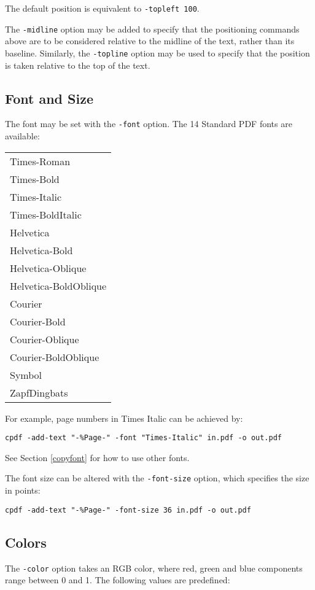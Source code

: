 \documentclass{book}
\begin{document}
The default position is equivalent to \texttt{-topleft 100}.

The \texttt{-midline} option may be added to specify that the positioning
commands above are to be considered relative to the midline of the text, rather
than its baseline. Similarly, the \texttt{-topline} option may be used to specify that the position is taken relative to the top of the text.

  \subsection{Font and Size}
  The font may be set with the \texttt{-font} option. The 14 Standard PDF fonts are available:

  \vspace{2mm}
  \begin{tabular}{l}
  Times-Roman\\
  Times-Bold\\
  Times-Italic\\
  Times-BoldItalic\\
  Helvetica\\
  Helvetica-Bold\\
  Helvetica-Oblique\\
  Helvetica-BoldOblique\\
  Courier\\
  Courier-Bold\\
  Courier-Oblique\\
  Courier-BoldOblique\\
  Symbol\\
  ZapfDingbats
  \end{tabular}

  \noindent For example, page numbers in Times Italic can be achieved by:
  \begin{framed}
    \small\verb!cpdf -add-text "-%Page-" -font "Times-Italic" in.pdf -o out.pdf!
  \end{framed}
  \noindent See Section \ref{copyfont} for how to use other fonts.

  The font size can be altered with the \texttt{-font-size} option, which
specifies the size in points:
  \begin{framed}
    \small\verb!cpdf -add-text "-%Page-" -font-size 36 in.pdf -o out.pdf!
  \end{framed}

  \subsection{Colors}
  The \texttt{-color} option takes an RGB color, where red, green and blue
components range between 0 and 1. The following values are predefined:
\end{document}
